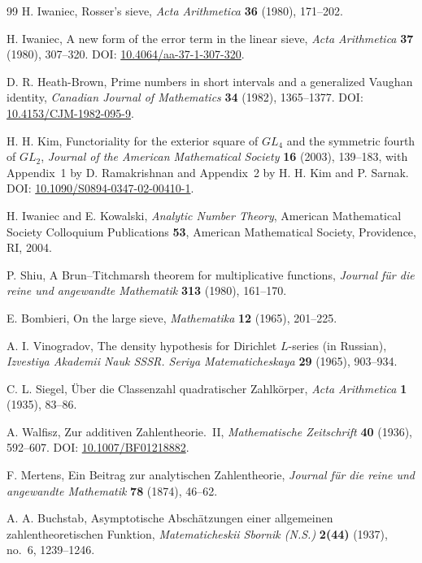 \begin{thebibliography}{99}
 H. Iwaniec,
Rosser's sieve,
\emph{Acta Arithmetica} \textbf{36} (1980), 171--202.

 H. Iwaniec,
A new form of the error term in the linear sieve,
\emph{Acta Arithmetica} \textbf{37} (1980), 307--320.
DOI: \href{https://doi.org/10.4064/aa-37-1-307-320}{10.4064/aa-37-1-307-320}.

 D. R. Heath-Brown,
Prime numbers in short intervals and a generalized Vaughan identity,
\emph{Canadian Journal of Mathematics} \textbf{34} (1982), 1365--1377.
DOI: \href{https://doi.org/10.4153/CJM-1982-095-9}{10.4153/CJM-1982-095-9}.

 H. H. Kim,
Functoriality for the exterior square of $GL_4$ and the symmetric fourth
of $GL_2$,
\emph{Journal of the American Mathematical Society} \textbf{16}
(2003), 139--183, with Appendix~1 by D. Ramakrishnan and Appendix~2
by H. H. Kim and P. Sarnak.
DOI: \href{https://doi.org/10.1090/S0894-0347-02-00410-1}{10.1090/S0894-0347-02-00410-1}.

 H. Iwaniec and E. Kowalski,
\emph{Analytic Number Theory}, American Mathematical Society Colloquium
Publications \textbf{53}, American Mathematical Society, Providence, RI, 2004.

 P. Shiu,
A Brun--Titchmarsh theorem for multiplicative functions,
\emph{Journal f\"ur die reine und angewandte Mathematik} \textbf{313}
(1980), 161--170.

 E. Bombieri,
On the large sieve,
\emph{Mathematika} \textbf{12} (1965), 201--225.

 A. I. Vinogradov,
The density hypothesis for Dirichlet $L$-series (in Russian),
\emph{Izvestiya Akademii Nauk SSSR. Seriya Matematicheskaya}
\textbf{29} (1965), 903--934.

 C. L. Siegel,
\"Uber die Classenzahl quadratischer Zahlk\"orper,
\emph{Acta Arithmetica} \textbf{1} (1935), 83--86.

 A. Walfisz,
Zur additiven Zahlentheorie.~II,
\emph{Mathematische Zeitschrift} \textbf{40} (1936), 592--607.
DOI: \href{https://doi.org/10.1007/BF01218882}{10.1007/BF01218882}.

 F. Mertens,
Ein Beitrag zur analytischen Zahlentheorie,
\emph{Journal f\"ur die reine und angewandte Mathematik} \textbf{78}
(1874), 46--62.

 A. A. Buchstab,
Asymptotische Absch\"atzungen einer allgemeinen zahlentheoretischen Funktion,
\emph{Matematicheskii Sbornik (N.S.)} \textbf{2(44)} (1937),
no.~6, 1239--1246.


\end{thebibliography}
